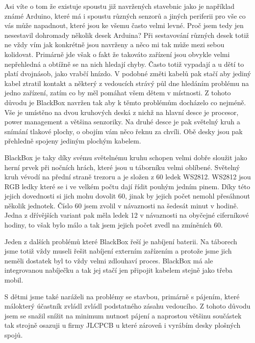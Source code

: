     Asi víte o tom že existuje spoustu již navržených stavebnic jako je například známé Arduino, 
    které má i spoustu různých senzorů a jiných periferii pro vše co vás může napadnout, které jsou ke všemu 
    často velmi levné. 
    Proč jsem tedy jen nesestavil dohromady několik desek Arduina? Při sestavování různých desek
    totiž ne vždy vím jak konkrétně jsou navrženy a něco mi tak může mezi sebou kolidovat.
    Primárně jde však o fakt že takováto zařízení jsou obvykle velmi nepřehledná a obtížně 
    se na nich hledají chyby. Často totiž vypadají a u dětí to platí dvojnásob, jako vrabčí hnízdo.
    V podobné změti kabelů pak stačí aby jediný kabel ztratil kontakt a některý z vedoucích 
    strávý půl dne hledáním problému na jedno zařízení, zatím co by měl pomáhat všem dětem v místnosti.
    Z tohoto důvodu je BlackBox navržen tak aby k těmto problémům docházelo co nejméně. 
    Vše je umístěno na dvou kruhových deská z nichž na hlavní desce je procesor, power management a většina
    senzoriky. Na druhé desce je pak světelný kruh a snímání tlakové plochy, o obojím vám něco řeknu za chvíli.
    Obě desky jsou pak přehledně spojeny jediným plochým kabelem.
 
    BlackBox je taky díky svému světelnému kruhu schopen velmi dobře sloužit jako herní prvek při nočních hrách,
    které jsou u táborníku velmi oblíbené.  %
    Světelný kruh vévodí na přední straně trezoru a je složen z 60 ledek WS2812. WS2812 jsou RGB ledky které 
    se i ve velkém počtu dají řídit pouhým jedním pinem. Díky této jejich dovednosti si jich mohu dovolit 60,
    jinak by jejich počet nemohl přesáhnout několik jednotek. Číslo 60 jsem zvolil v návaznosti na šedesát 
    minut v hodině. Jedna z dřívějších variant pak měla ledek 12 v návaznosti na obyčejné ciferníkové hodiny,
    to však bylo málo a tak jsem jejich počet zvedl na zmíněních 60.

    Jeden z dalších problémů které BlackBox řeší je nabíjení baterii. Na táborech jsme totiž vždy museli
    řešit nabíjení externím zařízením a protože jsme jich neměli dostatek byl to vždy velmi zdlouhaví proces.
    BlackBox má ale integrovanou nabíječku a tak jej stačí jen připojit kabelem stejně jako třeba mobil.

    S dětmi jsme také naráželi na problémy se stavbou, primárně s pájením, které málokterý 
    účastník zvládl zvládl podstatného zásahu vedoucího. Z tohoto důvodu jsem se snažil snížit na minimum 
    nutnost pájení a naprostou většinu součástek tak strojně osazuji u firmy JLCPCB u které zároveň i vyrábím 
    desky plošných spojů.

